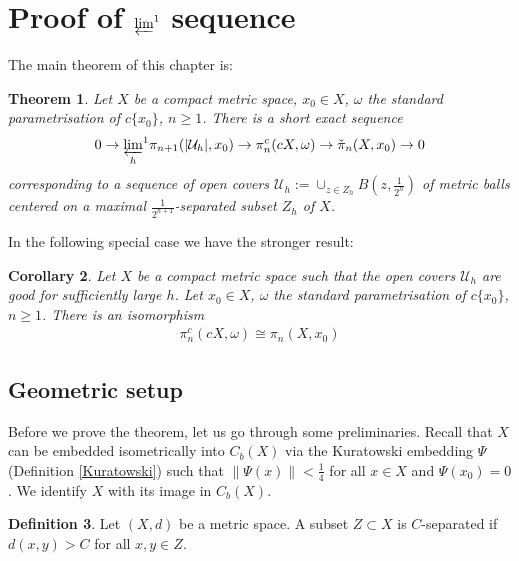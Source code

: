\documentclass[a4paper,11pt]{article}
\theoremstyle{definition}
\newtheorem{definition}{Definition}[section]
\theoremstyle{plain}
\newtheorem{theorem}[definition]{Theorem}
\newtheorem{cor}[definition]{Corollary}
\theoremstyle{remark}
\begin{document}
\newpage
\section{Proof of $\varprojlim^1$ sequence}

The main theorem of this chapter is:

\begin{theorem} \label{maintheorem} Let $X$ be a compact metric space, $x_0\in X$, $\omega$ the standard parametrisation of $c\{x_0\}$, $n\geq 1$. There is a short exact sequence 
\begin{align*}
0\rightarrow {\varprojlim_h}^1  \pi_{n+1}(|\mathcal{U}_{h}|,x_0) \rightarrow  \pi_{n}^c(cX,\omega) \rightarrow  \check{\pi}_n(X,x_0) \rightarrow 0
\end{align*}
corresponding to a sequence of open covers $\mathcal{U}_{h}:=\cup_{z\in Z_h} B(z,\frac{1}{2^h})$ of metric balls centered on a maximal $\frac{1}{2^{h+1}}$-separated subset $Z_{h}$ of $X$. 
\end{theorem}

In the following special case we have the stronger result: 

\begin{cor} \label{good} Let $X$ be a compact metric space such that the open covers $\mathcal{U}_{h}$ are good for sufficiently large $h$. Let $x_0\in X$, $\omega$ the standard parametrisation of $c\{x_0\}$, $n\geq 1$. There is an isomorphism
\begin{align*}
\pi_{n}^{c}(cX,\omega)\cong \pi_{n}(X,x_0)
\end{align*}
\end{cor}

\subsection{Geometric setup}

Before we prove the theorem, let us go through some preliminaries. Recall that $X$ can be embedded isometrically into $C_{b}(X)$ via the Kuratowski embedding $\Psi$ (Definition \ref{Kuratowski}) such that $\|\Psi(x)\| < \frac{1}{4}$ for all $x\in X$ and $\Psi(x_0) = 0$. We identify $X$ with its image in $C_{b}(X)$. 

\begin{definition} Let $(X,d)$ be a metric space. A subset $Z\subset X$ is $C$-separated if $d(x,y)> C$ for all $x,y\in Z$. 
\end{definition}
\end{document}
